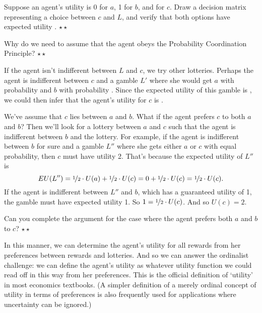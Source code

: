 \begin{exercise}
  Suppose an agent's utility is 0 for $a$, 1 for $b$, and
   for $c$. Draw a decision matrix representing a
  choice between $c$ and $L$, and verify that both options have
  expected utility . $\star\star$
\end{exercise}

\begin{exercise}
  Why do we need to assume that the agent obeys the Probability
  Coordination Principle? $\star\star$
\end{exercise}

If the agent isn't indifferent between $L$ and $c$, we try other
lotteries.%
Perhaps the agent is indifferent between $c$ and a gamble $L'$ where she
would get $a$ with probability  and $b$ with
probability . Since the expected utility of this gamble
is , we could then infer that the agent's utility for $c$
is .

We've assume that $c$ lies between $a$ and $b$. What if the agent
prefers $c$ to both $a$ and $b$? Then we'll look for a lottery between
$a$ and $c$ such that the agent is indifferent between $b$ and the
lottery. For example, if the agent is indifferent between $b$ for sure
and a gamble $L''$ where she gets either $a$ or $c$ with equal
probability, then $c$ must have utility 2. That's because the expected
utility of $L''$ is
\[
  EU(L'') = \nicefrac{1}{2} \cdot U(a) + \nicefrac{1}{2} \cdot U(c) =  
   0 + \nicefrac{1}{2} \cdot U(c) = \nicefrac{1}{2} \cdot U(c). 
\]
If the agent is indifferent between $L''$ and $b$, which has a
guaranteed utility of 1, the gamble must have expected utility 1. So
$1 = \nicefrac{1}{2} \cdot U(c)$. And so $U(c) = 2$.


\begin{exercise}
  Can you complete the argument for the case where the agent prefers
  both $a$ and $b$ to $c$? $\star\star$
\end{exercise}

In this manner, we can determine the agent's utility for all rewards
from her preferences between rewards and lotteries. And so we can
answer the ordinalist challenge: we can define the agent's utility as
whatever utility function we could read off in this way from her
preferences. This is the official definition of `utility' in most
economics textbooks. (A simpler definition of a merely ordinal concept
of utility in terms of preferences is also frequently used for
applications where uncertainty can be ignored.)

